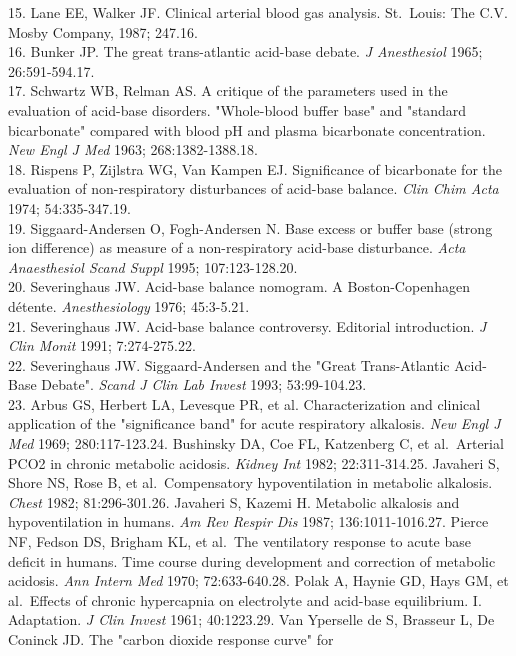 \documentclass[
  12pt,
  a4paperpaper,
]{report}
\begin{document}
15. Lane EE, Walker JF. Clinical arterial blood gas analysis. St.~Louis:
The C.V. Mosby Company, 1987; 247.16.\\
16. Bunker JP. The great trans-atlantic acid-base debate. \emph{J
Anesthesiol} 1965; 26:591-594.17.\\
17. Schwartz WB, Relman AS. A critique of the parameters used in the
evaluation of acid-base disorders. "Whole-blood buffer base" and
"standard bicarbonate" compared with blood pH and plasma bicarbonate
concentration. \emph{New Engl J Med} 1963; 268:1382-1388.18.\\
18. Rispens P, Zijlstra WG, Van Kampen EJ. Significance of bicarbonate
for the evaluation of non-respiratory disturbances of acid-base balance.
\emph{Clin Chim Acta} 1974; 54:335-347.19.\\
19. Siggaard-Andersen O, Fogh-Andersen N. Base excess or buffer base
(strong ion difference) as measure of a non-respiratory acid-base
disturbance. \emph{Acta Anaesthesiol Scand Suppl} 1995;
107:123-128.20.\\
20. Severinghaus JW. Acid-base balance nomogram. A Boston-Copenhagen
détente. \emph{Anesthesiology} 1976; 45:3-5.21.\\
21. Severinghaus JW. Acid-base balance controversy. Editorial
introduction. \emph{J Clin Monit} 1991; 7:274-275.22.\\
22. Severinghaus JW. Siggaard-Andersen and the "Great Trans-Atlantic
Acid-Base Debate". \emph{Scand J Clin Lab Invest} 1993; 53:99-104.23.\\
23. Arbus GS, Herbert LA, Levesque PR, et al. Characterization and
clinical application of the "significance band" for acute respiratory
alkalosis. \emph{New Engl J Med} 1969; 280:117-123.24. Bushinsky DA, Coe
FL, Katzenberg C, et al.~Arterial PCO2 in chronic metabolic acidosis.
\emph{Kidney Int} 1982; 22:311-314.25. Javaheri S, Shore NS, Rose B, et
al.~Compensatory hypoventilation in metabolic alkalosis. \emph{Chest}
1982; 81:296-301.26. Javaheri S, Kazemi H. Metabolic alkalosis and
hypoventilation in humans. \emph{Am Rev Respir Dis} 1987;
136:1011-1016.27. Pierce NF, Fedson DS, Brigham KL, et al.~The
ventilatory response to acute base deficit in humans. Time course during
development and correction of metabolic acidosis. \emph{Ann Intern Med}
1970; 72:633-640.28. Polak A, Haynie GD, Hays GM, et al.~Effects of
chronic hypercapnia on electrolyte and acid-base equilibrium. I.
Adaptation. \emph{J Clin Invest} 1961; 40:1223.29. Van Yperselle de S,
Brasseur L, De Coninck JD. The "carbon dioxide response curve" for
\end{document}
